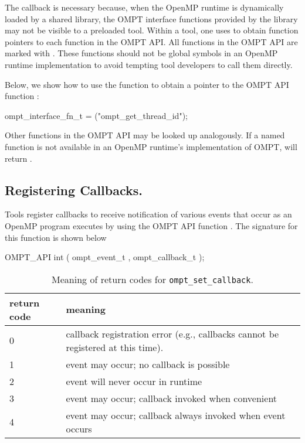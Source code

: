 \noindent
The  callback is necessary because, when the OpenMP runtime is dynamically loaded by a shared library, the OMPT interface functions provided by the library may not be visible to a preloaded tool.
Within a tool, one uses  to obtain function pointers to each function in the OMPT API.
All functions in the OMPT API are marked with .
These functions should not be global symbols in an OpenMP runtime implementation to avoid tempting tool developers to call them directly. 

Below, we show how to use the  function to obtain a pointer to the OMPT API function :

\begin{boxedcode}
ompt\_interface\_fn\_t  =
                        ("ompt\_get\_thread\_id");
\end{boxedcode}
Other functions in the OMPT API may be looked up analogously.
If a named function is not available in an OpenMP runtime's implementation of OMPT,  will return .

\subsection{Registering Callbacks.} 
Tools register callbacks to receive notification of various events that occur as an OpenMP program executes by using the OMPT API function .
The signature for this function is shown below
{
\begin{boxedcode}
OMPT\_API int (
  ompt\_event\_t ,
  ompt\_callback\_t 
);
\end{boxedcode}
}

\begin{table}
\centering
\begin{tabular}{|l|l|}
\hline
return code & meaning \\\hline
0 & callback registration error (e.g., callbacks cannot be registered at this time).\\\hline
1 & event may occur; no callback is possible\\\hline
2 & event will never occur in runtime\\\hline
3 & event may occur; callback invoked when convenient\\\hline
4 & event may occur; callback always invoked when event occurs\\\hline
\end{tabular}
\caption{Meaning of return codes for {\tt ompt\_set\_callback}.}
\label{table:ToolsSupport_set_rc}
\end{table}


